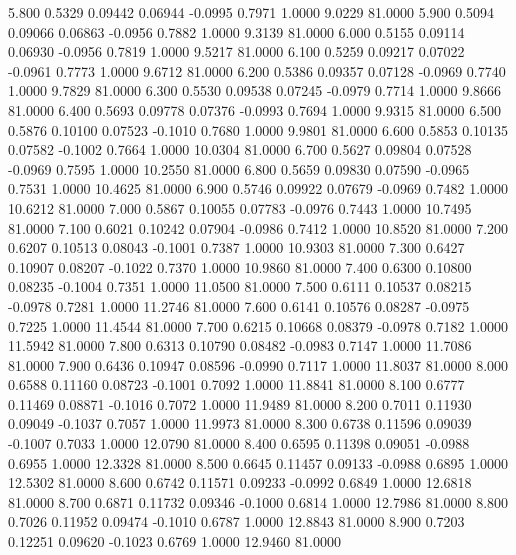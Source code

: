    5.800   0.5329   0.09442   0.06944  -0.0995   0.7971   1.0000   9.0229  81.0000
   5.900   0.5094   0.09066   0.06863  -0.0956   0.7882   1.0000   9.3139  81.0000
   6.000   0.5155   0.09114   0.06930  -0.0956   0.7819   1.0000   9.5217  81.0000
   6.100   0.5259   0.09217   0.07022  -0.0961   0.7773   1.0000   9.6712  81.0000
   6.200   0.5386   0.09357   0.07128  -0.0969   0.7740   1.0000   9.7829  81.0000
   6.300   0.5530   0.09538   0.07245  -0.0979   0.7714   1.0000   9.8666  81.0000
   6.400   0.5693   0.09778   0.07376  -0.0993   0.7694   1.0000   9.9315  81.0000
   6.500   0.5876   0.10100   0.07523  -0.1010   0.7680   1.0000   9.9801  81.0000
   6.600   0.5853   0.10135   0.07582  -0.1002   0.7664   1.0000  10.0304  81.0000
   6.700   0.5627   0.09804   0.07528  -0.0969   0.7595   1.0000  10.2550  81.0000
   6.800   0.5659   0.09830   0.07590  -0.0965   0.7531   1.0000  10.4625  81.0000
   6.900   0.5746   0.09922   0.07679  -0.0969   0.7482   1.0000  10.6212  81.0000
   7.000   0.5867   0.10055   0.07783  -0.0976   0.7443   1.0000  10.7495  81.0000
   7.100   0.6021   0.10242   0.07904  -0.0986   0.7412   1.0000  10.8520  81.0000
   7.200   0.6207   0.10513   0.08043  -0.1001   0.7387   1.0000  10.9303  81.0000
   7.300   0.6427   0.10907   0.08207  -0.1022   0.7370   1.0000  10.9860  81.0000
   7.400   0.6300   0.10800   0.08235  -0.1004   0.7351   1.0000  11.0500  81.0000
   7.500   0.6111   0.10537   0.08215  -0.0978   0.7281   1.0000  11.2746  81.0000
   7.600   0.6141   0.10576   0.08287  -0.0975   0.7225   1.0000  11.4544  81.0000
   7.700   0.6215   0.10668   0.08379  -0.0978   0.7182   1.0000  11.5942  81.0000
   7.800   0.6313   0.10790   0.08482  -0.0983   0.7147   1.0000  11.7086  81.0000
   7.900   0.6436   0.10947   0.08596  -0.0990   0.7117   1.0000  11.8037  81.0000
   8.000   0.6588   0.11160   0.08723  -0.1001   0.7092   1.0000  11.8841  81.0000
   8.100   0.6777   0.11469   0.08871  -0.1016   0.7072   1.0000  11.9489  81.0000
   8.200   0.7011   0.11930   0.09049  -0.1037   0.7057   1.0000  11.9973  81.0000
   8.300   0.6738   0.11596   0.09039  -0.1007   0.7033   1.0000  12.0790  81.0000
   8.400   0.6595   0.11398   0.09051  -0.0988   0.6955   1.0000  12.3328  81.0000
   8.500   0.6645   0.11457   0.09133  -0.0988   0.6895   1.0000  12.5302  81.0000
   8.600   0.6742   0.11571   0.09233  -0.0992   0.6849   1.0000  12.6818  81.0000
   8.700   0.6871   0.11732   0.09346  -0.1000   0.6814   1.0000  12.7986  81.0000
   8.800   0.7026   0.11952   0.09474  -0.1010   0.6787   1.0000  12.8843  81.0000
   8.900   0.7203   0.12251   0.09620  -0.1023   0.6769   1.0000  12.9460  81.0000
